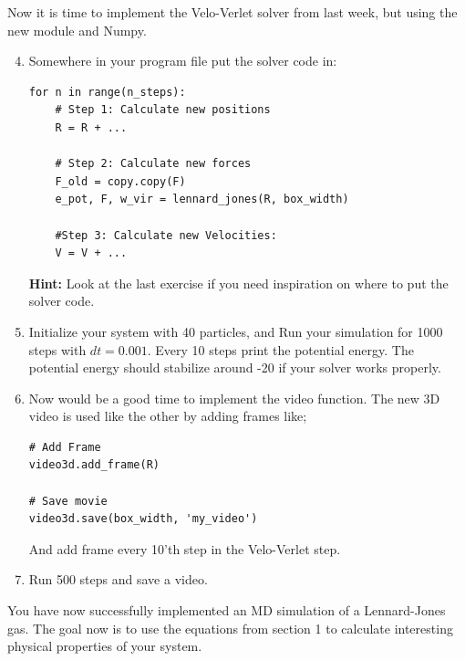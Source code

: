 \documentclass{article}
\begin{document}
Now it is time to implement the Velo-Verlet solver from last week, but using
the new module and Numpy.

\begin{enumerate}
    \setcounter{enumi}{3}

    \item Somewhere in your program file put the solver code in:

\begin{lstlisting}
for n in range(n_steps):
    # Step 1: Calculate new positions
    R = R + ...

    # Step 2: Calculate new forces
    F_old = copy.copy(F)
    e_pot, F, w_vir = lennard_jones(R, box_width)

    #Step 3: Calculate new Velocities:
    V = V + ...
\end{lstlisting}

    {\bf Hint:} Look at the last exercise if you need inspiration on where to
    put the solver code.

    \item Initialize your system with 40 particles,  and
        Run your simulation for 1000 steps with $dt = 0.001$.
        Every 10 steps print the potential energy. The potential energy should
        stabilize around -20 if your solver works properly.

    \item Now would be a good time to implement the video function.
        The new 3D video is used like the other by adding frames like;

\begin{lstlisting}
# Add Frame
video3d.add_frame(R)

# Save movie
video3d.save(box_width, 'my_video')

\end{lstlisting}

        And add frame every 10'th step in the Velo-Verlet step.

    \item Run 500 steps and save a video.

\end{enumerate}


You have now successfully implemented an MD simulation of a Lennard-Jones gas.
The goal now is to use the equations from section 1 to calculate interesting
physical properties of your system.
\end{document}

